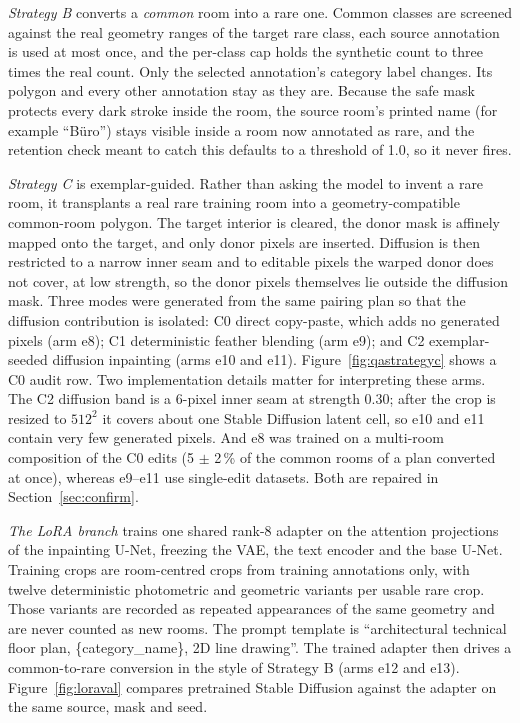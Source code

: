 \emph{Strategy B} converts a \emph{common} room into a rare one. Common classes
are screened against the real geometry ranges of the target rare class, each
source annotation is used at most once, and the per-class cap holds the
synthetic count to three times the real count. Only the selected annotation's category label changes. Its polygon and every
other annotation stay as they are. Because the safe mask protects every dark
stroke inside the room, the source room's printed name (for example
``B\"uro'') stays visible inside a room now annotated as rare, and the retention
check meant to catch this defaults to a threshold of 1.0, so it never fires.

\emph{Strategy C} is exemplar-guided. Rather than asking the model to invent a
rare room, it transplants a real rare training room into a geometry-compatible
common-room polygon. The target interior is cleared, the donor mask is affinely
mapped onto the target, and only donor pixels are inserted. Diffusion is then
restricted to a narrow inner seam and to editable pixels the warped donor does
not cover, at low strength, so the donor pixels themselves lie outside the
diffusion mask. Three modes were generated from the same pairing plan so that
the diffusion contribution is isolated: C0 direct copy-paste, which adds no
generated pixels (arm e8); C1 deterministic feather blending (arm e9); and C2
exemplar-seeded diffusion inpainting (arms e10 and e11). Figure~\ref{fig:qastrategyc} shows a C0 audit row.
Two implementation details matter for interpreting these arms. The C2
diffusion band is a 6-pixel inner seam at strength 0.30; after the crop is
resized to $512^2$ it covers about one Stable Diffusion latent cell, so e10 and
e11 contain very few generated pixels. And e8 was trained on a multi-room
composition of the C0 edits (5 $\pm$ 2\,\% of the common rooms of a plan
converted at once), whereas e9--e11 use single-edit datasets. Both are repaired
in Section~\ref{sec:confirm}.

\emph{The LoRA branch} trains one shared rank-8 adapter on the attention
projections of the inpainting U-Net, freezing the VAE, the text encoder and the
base U-Net. Training crops are room-centred crops from training annotations
only, with twelve deterministic photometric and geometric variants per usable
rare crop. Those variants are recorded as repeated appearances of the same
geometry and are never counted as new rooms. The prompt template is
``architectural technical floor plan, \{category\_name\}, 2D line drawing''. The
trained adapter then drives a common-to-rare conversion in the style of Strategy
B (arms e12 and e13). Figure~\ref{fig:loraval} compares pretrained Stable
Diffusion against the adapter on the same source, mask and seed.


